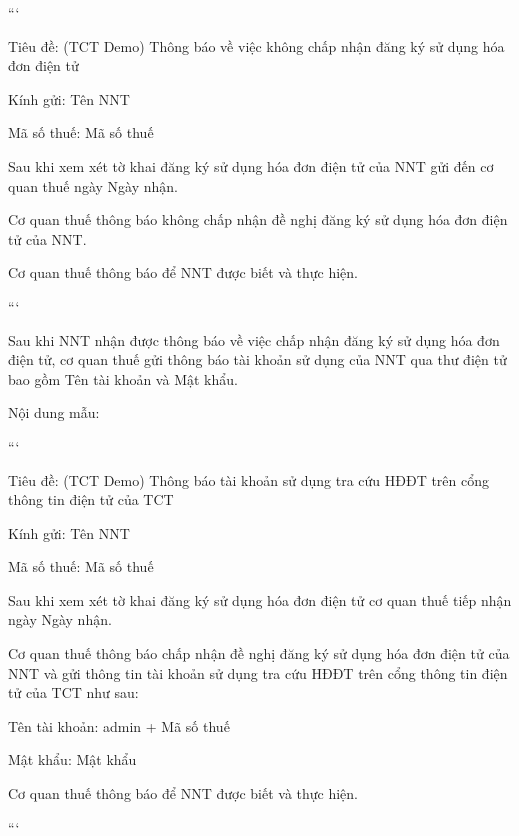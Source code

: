 ```

Tiêu đề: (TCT Demo) Thông báo về việc không chấp nhận đăng ký sử dụng hóa đơn điện tử

Kính gửi: {{Tên NNT}}

Mã số thuế: {{Mã số thuế}}

Sau khi xem xét tờ khai đăng ký sử dụng hóa đơn điện tử của NNT gửi đến cơ quan thuế ngày {{Ngày nhận}}.

Cơ quan thuế thông báo không chấp nhận đề nghị đăng ký sử dụng hóa đơn điện tử của NNT.

Cơ quan thuế thông báo để NNT được biết và thực hiện.

```


Sau khi NNT nhận được thông báo về việc chấp nhận đăng ký sử dụng hóa đơn điện tử, cơ quan thuế gửi thông báo tài khoản sử dụng của NNT qua thư điện tử bao gồm Tên tài khoản và Mật khẩu.

Nội dung mẫu:

```

Tiêu đề: (TCT Demo) Thông báo tài khoản sử dụng tra cứu HĐĐT trên cổng thông tin điện tử của TCT

Kính gửi: {{Tên NNT}}

Mã số thuế: {{Mã số thuế}}

Sau khi xem xét tờ khai đăng ký sử dụng hóa đơn điện tử cơ quan thuế tiếp nhận ngày {{Ngày nhận}}.

Cơ quan thuế thông báo chấp nhận đề nghị đăng ký sử dụng hóa đơn điện tử của NNT và gửi thông tin tài khoản sử dụng tra cứu HĐĐT trên cổng thông tin điện tử của TCT như sau:

Tên tài khoản: {{admin + Mã số thuế}}

Mật khẩu: {{Mật khẩu}}

Cơ quan thuế thông báo để NNT được biết và thực hiện.

```










